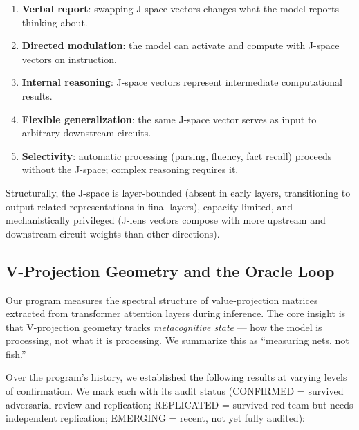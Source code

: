 \documentclass[11pt,a4paper]{article}
\begin{document}
\begin{enumerate}[nosep]
\item \textbf{Verbal report}: swapping J-space vectors changes what the
  model reports thinking about.
\item \textbf{Directed modulation}: the model can activate and compute
  with J-space vectors on instruction.
\item \textbf{Internal reasoning}: J-space vectors represent intermediate
  computational results.
\item \textbf{Flexible generalization}: the same J-space vector serves as
  input to arbitrary downstream circuits.
\item \textbf{Selectivity}: automatic processing (parsing, fluency, fact
  recall) proceeds without the J-space; complex reasoning requires it.
\end{enumerate}

Structurally, the J-space is layer-bounded (absent in early layers,
transitioning to output-related representations in final layers),
capacity-limited, and mechanistically privileged (J-lens vectors compose
with more upstream and downstream circuit weights than other directions).

\subsection{V-Projection Geometry and the Oracle Loop}

Our program measures the spectral structure of value-projection matrices
extracted from transformer attention layers during inference. The core
insight is that V-projection geometry tracks \emph{metacognitive state}
--- how the model is processing, not what it is processing. We summarize
this as ``measuring nets, not fish.''

Over the program's history, we established the following results at
varying levels of confirmation. We mark each with its audit status
(CONFIRMED = survived adversarial review and replication;
REPLICATED = survived red-team but needs independent replication;
EMERGING = recent, not yet fully audited):
\end{document}
